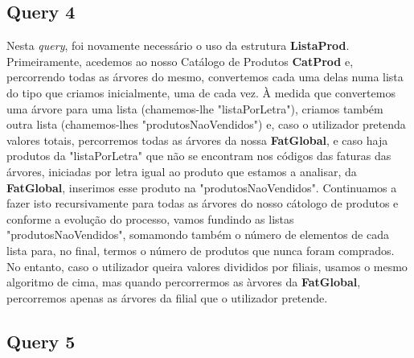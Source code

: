 \documentclass{article}
\begin{document}
\subsection{Query 4}

\noindent{}
\vspace{1cm}

\par\noindent\hspace{0.52cm} Nesta \textit{query}, foi novamente necessário o uso da estrutura \textbf{ListaProd}. Primeiramente, acedemos ao nosso Catálogo de Produtos \textbf{CatProd} e, percorrendo todas as árvores do mesmo, convertemos cada uma delas numa lista do tipo que criamos inicialmente, uma de cada vez. À medida que convertemos uma árvore para uma lista (chamemos-lhe "listaPorLetra"), criamos também outra lista (chamemos-lhes "produtosNaoVendidos") e, caso o utilizador pretenda valores totais, percorremos  todas as árvores da nossa \textbf{FatGlobal}, e caso haja produtos da "listaPorLetra" que não se encontram nos códigos das faturas das árvores, iniciadas por letra igual ao produto que estamos a analisar, da \textbf{FatGlobal}, inserimos esse produto na "produtosNaoVendidos". Continuamos a fazer isto recursivamente para todas as árvores do nosso cátologo de produtos e conforme a evolução do processo, vamos fundindo as listas "produtosNaoVendidos", somamondo também o número de elementos de cada lista para, no final, termos o número de produtos que nunca foram comprados. No entanto, caso o utilizador queira valores divididos por filiais, usamos o mesmo algoritmo de cima, mas quando percorrermos as àrvores da \textbf{FatGlobal}, percorremos apenas as árvores da filial que o utilizador pretende.

\subsection{Query 5}

\noindent{}
\vspace{1cm}
\end{document}
